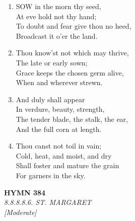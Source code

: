 \begin{enumerate}
    \item SOW in the morn thy seed, \\
        At eve hold not thy hand; \\
        To doubt and fear give thou no heed, \\
        Broadcast it o'er the land.

    \item Thou know'st not which may thrive, \\
        The late or early sown; \\
        Grace keeps the chosen germ alive, \\
        When and wherever strewn.

    \item And duly shall appear \\
        In verdure, beauty, strength, \\
        The tender blade, the stalk, the ear, \\
        And the full corn at length.

    \item Thou canst not toil in vain; \\
        Cold, heat, and moist, and dry \\
        Shall foster and mature the grain \\
        For garners in the sky.

\end{enumerate}

\newpage
\begin{center}
    {\Large \textbf{HYMN 384}}
    \\
    \textit{8.8.8.8.6. ST. MARGARET}
    \\
    \textit{\small [Moderate]}
\end{center}
\vspace{1em}

